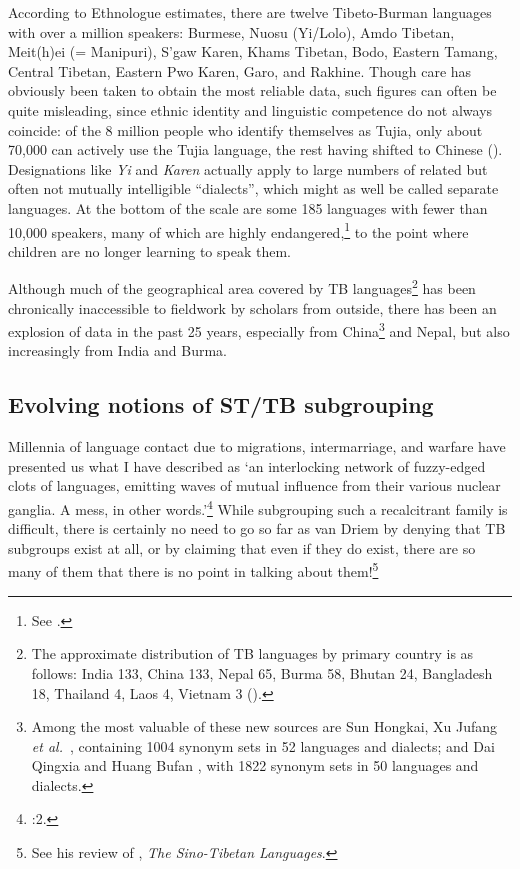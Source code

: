 According to Ethnologue estimates, there are twelve Tibeto-Burman languages with over a million speakers: Burmese, Nuosu (Yi/Lolo), Amdo Tibetan, Meit(h)ei (= Manipuri), S’gaw Karen, Khams Tibetan, Bodo, Eastern Tamang, Central Tibetan, Eastern Pwo Karen, Garo, and Rakhine. Though care has obviously been taken to obtain the most reliable data, such figures can often be quite misleading, since ethnic identity and linguistic competence do not always coincide: of the 8 million people who identify themselves as Tujia, only about 70,000 can actively use the Tujia language, the rest having shifted to Chinese (\citealt{LSF-ELW17}). Designations like {\it Yi} and {\it Karen} actually apply to large numbers of related but often not mutually intelligible “dialects”, which might as well be called separate languages. At the bottom of the scale are some 185 languages with fewer than 10,000 speakers, many of which are highly endangered,\footnote{See \citealt{JAM-ELMSEA}.} to the point where children are no longer learning to speak them.

Although much of the geographical area covered by TB languages\footnote{The approximate distribution of TB languages by primary country is as follows: India 133, China 133, Nepal 65, Burma 58, Bhutan 24, Bangladesh 18, Thailand 4, Laos 4, Vietnam 3 (\citealt{LSF-ELW17}).} has been chronically inaccessible to fieldwork by scholars from outside, there has been an explosion of data in the past 25 years, especially from China\footnote{Among the most valuable of these new sources are Sun Hongkai, Xu Jufang {\it et al.}\ \citeyearpar{ZMYYC}, containing 1004 synonym sets in 52 languages and dialects; and Dai Qingxia and Huang Bufan \citeyearpar{TBL}, with 1822 synonym sets in 50 languages and dialects.} and Nepal, but also increasingly from India and Burma.

\subsection{Evolving notions of ST/TB subgrouping}

Millennia of language contact due to migrations, intermarriage, and warfare have presented us what I
have described as ‘an interlocking network of fuzzy-edged clots of languages,
emitting waves of mutual influence from their various nuclear ganglia. A mess,
in other words.’\footnote{\textit{}:2.}  While subgrouping such
a recalcitrant family is difficult, there is certainly no need to go so far as
van Driem by denying that TB subgroups exist at all, or by claiming that even if
they do exist, there are so many of them that there is no point in talking about
them!\footnote{See his review \citeyearpar{SVD-STL} of \citealt{STL},
\textit{The Sino-Tibetan Languages}.}


